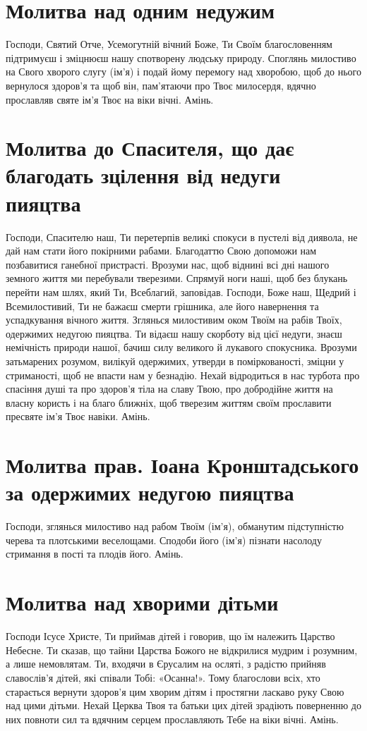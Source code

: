 \documentclass[chapters.tex]{subfiles}
\begin{document}
\section{Молитва над одним недужим}
Господи, Святий Отче, Усемогутній вічний Боже, Ти Своїм благословенням підтримуєш і зміцнюєш нашу спотворену людську природу. Споглянь милостиво на Свого хворого слугу (ім’я) і подай йому перемогу над хворобою, щоб до нього вернулося здоров’я та щоб він, пам’ятаючи про Твоє милосердя, вдячно прославляв святе ім’я Твоє на віки вічні. Амінь.

\section{Молитва до Спасителя, що дає благодать зцілення від недуги пияцтва}
Господи, Спасителю наш, Ти перетерпів великі спокуси в пустелі від диявола, не дай нам стати його покірними рабами. Благодаттю Свою допоможи нам позбавитися ганебної пристрасті. Врозуми нас, щоб віднині всі дні нашого земного життя ми перебували тверезими. Спрямуй ноги наші, щоб без блукань перейти нам шлях, який Ти, Всеблагий, заповідав. Господи, Боже наш, Щедрий і Всемилостивий, Ти не бажаєш смерти грішника, але його навернення та успадкування вічного життя. Зглянься милостивим оком Твоїм на рабів Твоїх, одержимих недугою пияцтва. Ти відаєш нашу скорботу від цієї недуги, знаєш немічність природи нашої, бачиш силу великого й лукавого спокусника. Врозуми затьмарених розумом, вилікуй одержимих, утверди в поміркованості, зміцни у стриманості, щоб не впасти нам у безнадію. Нехай відродиться в нас турбота про спасіння душі та про здоров’я тіла на славу Твою, про добродійне життя на власну користь і на благо ближніх, щоб тверезим життям своїм прославити пресвяте ім’я Твоє навіки. Амінь.

\section{Молитва прав. Іоана Кронштадського за одержимих недугою пияцтва}
Господи, зглянься милостиво над рабом Твоїм (ім’я), обманутим підступністю черева та плотськими веселощами. Сподоби його (ім’я) пізнати насолоду стримання в пості та плодів його. Амінь.

\section{Молитва над хворими дітьми}
Господи Ісусе Христе, Ти приймав дітей і говорив, що їм належить Царство Небесне. Ти сказав, що тайни Царства Божого не відкрилися мудрим і розумним, а лише немовлятам. Ти, входячи в Єрусалим на осляті, з радістю прийняв славослів’я дітей, які співали Тобі: «Осанна!». Тому благослови всіх, хто старається вернути здоров’я цим хворим дітям і простягни ласкаво руку Свою над цими дітьми. Нехай Церква Твоя та батьки цих дітей зрадіють поверненню до них повноти сил та вдячним серцем прославляють Тебе на віки вічні. Амінь.
\end{document}
